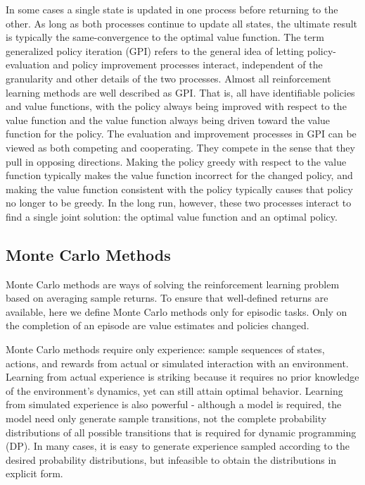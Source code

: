 \documentclass[11pt]{article}
\theoremstyle{plain} %
\theoremstyle{remark}
\begin{document}
In some cases a single state is updated in one process before
returning to the other. As long as both processes continue to update all states, the ultimate
result is typically the same-convergence to the optimal value function. The term generalized policy iteration (GPI) refers to the general idea
of letting policy-evaluation and policy improvement processes interact,
independent of the granularity and other details of the two processes. Almost all reinforcement learning methods are well described as GPI. That is, all have identifiable policies and value functions, with the
policy always being improved with respect to the value function and the
value function always being driven toward the value function for the policy. The evaluation and improvement processes in GPI can be viewed as both
competing and cooperating. They compete in the sense that they pull in opposing directions. Making the policy greedy with respect to the value function typically
makes the value function incorrect for the changed policy, and making the
value function consistent with the policy typically causes that policy no
longer to be greedy. In the long run, however, these two processes interact to find a
single joint solution: the optimal value function and an optimal policy.


\subsection{Monte Carlo Methods}
 Monte Carlo methods are ways of solving the reinforcement learning
        problem based on averaging sample returns. To ensure that well-defined returns are available, here we define
        Monte Carlo methods only for episodic tasks. Only on the completion of an episode are value estimates and policies
        changed.

  Monte Carlo methods require only experience: sample sequences of
        states, actions, and rewards from actual or simulated interaction with an
        environment. Learning from actual experience is striking because it requires no
        prior knowledge of the environment's dynamics, yet can still attain optimal
        behavior. Learning from simulated experience is also powerful - although a model
        is required, the model need only generate sample transitions, not the
        complete probability distributions of all possible transitions that is
        required for dynamic programming (DP). In many cases, it is easy to generate experience sampled according to
        the desired probability distributions, but infeasible to obtain the
        distributions in explicit form.
\end{document}
